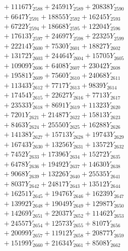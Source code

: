\documentclass[a4paper,10pt]{article}
\begin{document}
{\begin{align}
&\;  + 11167 Y_{2588} + 24591 Y_{2589} + 20838 Y_{2590} \\[0.3ex]
&\;  + 6647 Y_{2591} + 18855 Y_{2592} + 16245 Y_{2593} \\[0.3ex]
&\;  + 6722 Y_{2594} + 18668 Y_{2595} + 12204 Y_{2596} \\[0.3ex]
&\;  + 17613 Y_{2597} + 24697 Y_{2598} + 22325 Y_{2599} \\[0.3ex]
&\;  + 22214 Y_{2600} + 7530 Y_{2601} + 18827 Y_{2602} \\[0.3ex]
&\;  + 13172 Y_{2603} + 24464 Y_{2604} + 15705 Y_{2605} \\[0.3ex]
&\;  + 10909 Y_{2606} + 6408 Y_{2607} + 23042 Y_{2608} \\[0.5ex]\allowbreak
&\;  + 19581 Y_{2609} + 7560 Y_{2610} + 24068 Y_{2611} \\[0.3ex]
&\;  + 11343 Y_{2612} + 7717 Y_{2613} + 9839 Y_{2614} \\[0.3ex]
&\;  + 17454 Y_{2615} + 22627 Y_{2616} + 7713 Y_{2617} \\[0.3ex]
&\;  + 23533 Y_{2618} + 8691 Y_{2619} + 11323 Y_{2620} \\[0.3ex]
&\;  + 7201 Y_{2621} + 21487 Y_{2622} + 15813 Y_{2623} \\[0.3ex]
&\;  + 8463 Y_{2624} + 25550 Y_{2625} + 16288 Y_{2626} \\[0.3ex]
&\;  + 14138 Y_{2627} + 15713 Y_{2628} + 19743 Y_{2629} \\[0.3ex]
&\;  + 16743 Y_{2630} + 13256 Y_{2631} + 13572 Y_{2632} \\[0.3ex]
&\;  + 7452 Y_{2633} + 17396 Y_{2634} + 15272 Y_{2635} \\[0.3ex]
&\;  + 6478 Y_{2636} + 19492 Y_{2637} + 14630 Y_{2638} \\[0.5ex]\allowbreak
&\;  + 9068 Y_{2639} + 13226 Y_{2640} + 25535 Y_{2641} \\[0.3ex]
&\;  + 8037 Y_{2642} + 24817 Y_{2643} + 13512 Y_{2644} \\[0.3ex]
&\;  + 16251 Y_{2645} + 19476 Y_{2646} + 16239 Y_{2647} \\[0.3ex]
&\;  + 13992 Y_{2648} + 19049 Y_{2649} + 12987 Y_{2650} \\[0.3ex]
&\;  + 14269 Y_{2651} + 22037 Y_{2652} + 11462 Y_{2653} \\[0.3ex]
&\;  + 24557 Y_{2654} + 12573 Y_{2655} + 8107 Y_{2656} \\[0.3ex]
&\;  + 20099 Y_{2657} + 11912 Y_{2658} + 20877 Y_{2659} \\[0.3ex]
&\;  + 15199 Y_{2660} + 21634 Y_{2661} + 8508 Y_{2662} \\[0.3ex]

\end{align}}
\end{document}
